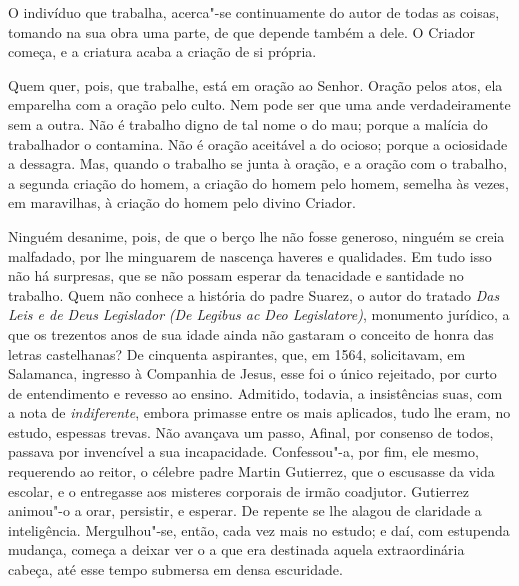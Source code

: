 O indivíduo que trabalha, acerca"-se continuamente do autor de
todas as coisas, tomando na sua obra uma parte, de que depende também a
dele. O Criador começa, e a criatura acaba a criação de si própria.

Quem quer, pois, que trabalhe, está em oração ao Senhor. Oração
pelos atos, ela emparelha com a oração pelo culto. Nem pode ser que uma
ande verdadeiramente sem a outra. Não é trabalho digno de tal nome o do
mau; porque a malícia do trabalhador o contamina. Não é oração
aceitável a do ocioso; porque a ociosidade a dessagra. Mas, quando o
trabalho se junta à oração, e a oração com o trabalho, a segunda
criação do homem, a criação do homem pelo homem, semelha às vezes, em
maravilhas, à criação do homem pelo divino Criador.

Ninguém desanime, pois, de que o berço lhe não fosse generoso,
ninguém se creia malfadado, por lhe minguarem de nascença haveres e
qualidades. Em tudo isso não há surpresas, que se não possam esperar da
tenacidade e santidade no trabalho. Quem não conhece a história do
padre Suarez, o autor do tratado \textit{Das Leis e de Deus Legislador}
\textit{(De Legibus ac Deo Legislatore)}, monumento jurídico, a que os
trezentos anos de sua idade ainda não gastaram o conceito de honra das
letras castelhanas? De cinquenta aspirantes, que, em 1564, solicitavam,
em Salamanca, ingresso à Companhia de Jesus, esse foi o único rejeitado, por curto de
entendimento e revesso ao ensino. Admitido, todavia, a insistências
suas, com a nota de \textit{indiferente}, embora primasse entre os mais
aplicados, tudo lhe eram, no estudo, espessas trevas. Não avançava um
passo, Afinal, por consenso de todos, passava por invencível a sua
incapacidade. Confessou"-a, por fim, ele mesmo, requerendo ao reitor, o
célebre padre Martin Gutierrez, que o escusasse da vida escolar, e o
entregasse aos misteres corporais de irmão coadjutor. Gutierrez
animou"-o a orar, persistir, e esperar. De repente se lhe alagou de
claridade a inteligência. Mergulhou"-se, então, cada vez mais no estudo;
e daí, com estupenda mudança, começa a deixar ver o a que era destinada
aquela extraordinária cabeça, até esse tempo submersa em densa escuridade.

